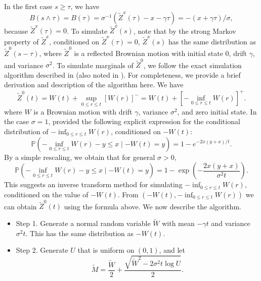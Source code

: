 \documentclass[11pt]{article}
\theoremstyle{definition}
\theoremstyle{plain}
\newcommand{\pr}{\mathbb{P}}
\begin{document}
\begin{appendices}
In the first case $s \geq \tau$, we have
\[
B(s\wedge \tau) = B(\tau) = \sigma^{-1}\left(\tilde Z^x (\tau) - x - \gamma \tau\right) = -(x+\gamma \tau)/\sigma, 
\]
because $\tilde Z^x(\tau) = 0$. To simulate $\tilde Z^x(s)$, note that by the strong Markov property of $\tilde Z^x$, 
conditioned on $\tilde Z^x(\tau) = 0$, $\tilde Z^x(s)$ has the same distribution as $\tilde{Z}^0(s-\tau)$, 
where $\tilde{Z}^0$ is a reflected Brownian motion with initial state $0$, drift $\gamma$, 
and variance $\sigma^2$. 
To simulate marginals of $\tilde Z^0$, we follow the exact simulation algorithm described in \cite{AsmussenGlynnPitman1995}
(also noted in \cite{Lepingle1984, AsmussenGlynn2007}). 
For completeness, we provide a brief derivation and description of the algorithm here. We have
\[
\tilde Z^0(t) = W(t) + \sup_{0\leq r \leq t} [W(r)]^-
= W(t) + \left[-\inf_{0\le r\le t} W(r)\right]^+.
\]
where $W$ is a Brownian motion with drift $\gamma$, variance $\sigma^2$, and zero initial state. 
In the case $\sigma = 1$, \cite{AsmussenGlynnPitman1995} provided the following explicit expression 
for the conditional distribution of $-\inf_{0\le r\le t} W(r)$, 
conditioned on $-W(t)$:
\[
\pr\left(-\inf_{0\le r\le t} W(r) - y \leq x \mid -W(t) = y \right)
= 1 - e^{-2x(y+x)/t}.
\]
By a simple rescaling, we obtain that for general $\sigma > 0$, 
\[
\pr\left(-\inf_{0\le r\le t} W(r) - y \leq x \mid -W(t) = y \right)
= 1 - \exp\left(-\frac{2x(y+x)}{\sigma^2 t}\right).
\]
This suggests an inverse transform method for simulating $-\inf_{0\le r\le t} W(r)$, conditioned on the value of $-W(t)$. 
From $\left(-W(t), -\inf_{0\le r\le t} W(r)\right)$ we can obtain $\tilde Z^0(t)$ using the formula above.
We now describe the algorithm.
\begin{itemize}
\item[] Step 1. Generate a normal random variable $\tilde W$ with mean $-\gamma t$ 
and variance $\sigma^2 t$. This has the same distribution as $-W(t)$.
\item[] Step 2. Generate $U$ that is uniform on $(0, 1)$, and let 
\[
\tilde M = \frac{\tilde W}{2} + \frac{\sqrt{\tilde W^2 - 2\sigma^2 t\log U}}{2}.
\]
\end{itemize}
\end{appendices}
\end{document}
